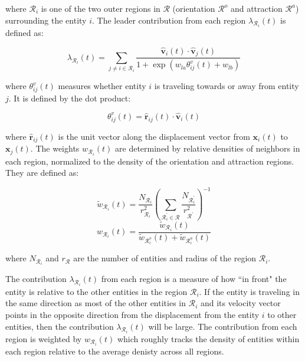 \documentclass[conference]{IEEEtran}
\begin{document}
where $\mathcal{R}_i$ is one of the two outer regions in $\bm{\mathcal{R}}$ (orientation $\mathcal{R}^o$ and attraction $\mathcal{R}^a$) surrounding the entity $i$.
The leader contribution from each region $\lambda_{\mathcal{R}_i}(t)$ is defined as:

\begin{equation}
    \lambda_{\mathcal{R}_i}(t) = \sum_{j\neq i \in \mathcal{R}_i}\frac{\hat{\mathbf{v}}_i(t)\cdot\hat{\mathbf{v}}_j(t)}{1+\exp\left(w_{la}\theta^v_{ij}(t)+w_{lb}\right)}
    \label{eqn:leaderRegionContribution}
\end{equation}

where $\theta^v_{ij}(t)$ measures whether entity $i$ is traveling towards or away from entity $j$.
It is defined by the dot product:

\begin{equation}
    \theta^v_{ij}(t) = \hat{\mathbf{r}}_{ij}(t)\cdot\hat{\mathbf{v}}_i(t)
    \label{eqn:thetav}
\end{equation}

where $\hat{\mathbf{r}}_{ij}(t)$ is the unit vector along the displacement vector from $\mathbf{x}_i(t)$ to $\mathbf{x}_j(t)$.
The weights $w_{\mathcal{R}_i}(t)$ are determined by relative densities of neighbors in each region, normalized to the density of the orientation and attraction regions.
They are defined as:

\begin{equation}
    \widetilde{w}_{\mathcal{R}_i}(t) = \frac{N_{\mathcal{R}_i}}{r^2_{\mathcal{R}_i}}\left(\sum_{\mathcal{R}_i^{\prime}\in\bm{\mathcal{R}}}\frac{N_{\mathcal{R}_i^{\prime}}}{r^2_{\mathcal{R}^{\prime}}}\right)^{-1}
\end{equation}
\begin{equation}
    w_{\mathcal{R}_i}(t) = \frac{\widetilde{w}_{\mathcal{R}_i}(t)}{\widetilde{w}_{\mathcal{R}^o_i}(t) + \widetilde{w}_{\mathcal{R}^a_i}(t)}
    \label{eqn:regionweight}
\end{equation}

where $N_{\mathcal{R}_i}$ and $r_{\mathcal{R}}$ are the number of entities and radius of the region $\mathcal{R}_i$.

The contribution $\lambda_{\mathcal{R}_i}(t)$ from each region is a measure of how ``in front" the entity is relative to the other entities in the region $\mathcal{R}_i$.
If the entity is traveling in the same direction as most of the other entities in $\mathcal{R}_i$ and its velocity vector points in the opposite direction from the displacement from the entity $i$ to other entities, then the contribution $\lambda_{\mathcal{R}_i}(t)$ will be large.
The contribution from each region is weighted by $w_{\mathcal{R}_i}(t)$ which roughly tracks the density of entities within each region relative to the average denisty across all regions.
\end{document}
